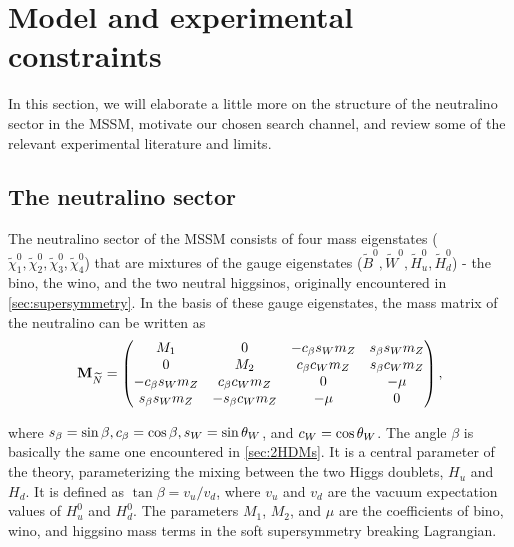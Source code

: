 \section{Model and experimental constraints}\label{sec:model}

In this section, we will elaborate a little more on the structure of the neutralino sector in the MSSM, motivate our chosen search channel, and review some of the relevant experimental literature and limits.

\subsection{The neutralino sector}
The neutralino sector of the MSSM consists of four mass eigenstates ($\widetilde{\chi}_1^0,\widetilde{\chi}_2^0,\widetilde{\chi}_3^0,\widetilde{\chi}_4^0$)  that are mixtures of the gauge eigenstates ($\widetilde{B}^0,\widetilde{W}^0,\widetilde{H}_u^0,\widetilde{H}^0_d$) - the bino, the wino, and the two neutral higgsinos, originally encountered in \autoref{sec:supersymmetry}. In the basis of these gauge eigenstates, the mass matrix of the neutralino can be written as
\[\mathbf{M}_{\widetilde{N}}=
\begin{pmatrix}
  M_1 & 0 & -c_\beta s_Wm_Z & s_\beta s_Wm_Z \\
  0 & M_2 & c_\beta c_Wm_Z & s_\beta c_Wm_Z \\
  -c_\beta s_Wm_Z & c_\beta c_Wm_Z & 0 & -\mu \\
  s_\beta s_Wm_Z & -s_\beta c_Wm_Z & -\mu & 0
\end{pmatrix},\]

\noindent where $s_\beta = \sin\beta, c_\beta = \cos\beta, s_W = \sin\theta_{W}$,  and  $c_W = \cos\theta_W$. The angle $\beta$ is basically the same one encountered in \autoref{sec:2HDMs}. It is a central parameter of the theory, parameterizing the mixing between the two Higgs doublets, $H_u$ and $H_d$. It is defined as $\tan\beta = v_u/v_d$, where $v_u$ and $v_d$ are the vacuum expectation values of $H_u^0$ and $H_d^0$. The parameters $M_1$, $M_2$, and $\mu$ are the coefficients of bino, wino, and higgsino mass terms in the soft supersymmetry breaking Lagrangian.

